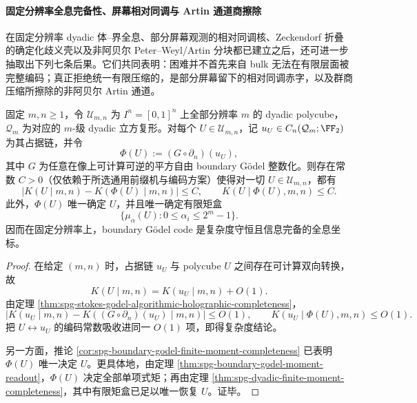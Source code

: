 \paragraph{固定分辨率全息完备性、屏幕相对同调与 Artin 通道商擦除}
在固定分辨率 dyadic 体--界全息、部分屏幕观测的相对同调核、Zeckendorf 折叠的确定化歧义壳以及非阿贝尔 Peter--Weyl/Artin 分块都已建立之后，还可进一步抽取出下列七条后果。它们共同表明：困难并不首先来自 bulk 无法在有限层面被完整编码；真正拒绝统一有限压缩的，是部分屏幕留下的相对同调赤字，以及群商压缩所擦除的非阿贝尔 Artin 通道。

\begin{theorem}\label{thm:xi-time-part9x-fixed-resolution-stokes-godel-strong-completeness}
固定 \(m,n\ge 1\)，令 \(\mathcal U_{m,n}\) 为 \(I^n=[0,1]^n\) 上全部分辨率 \(m\) 的 dyadic polycube，\(\mathcal Q_m\) 为对应的 \(m\)-级 dyadic 立方复形。对每个 \(U\in\mathcal U_{m,n}\)，记 \(u_U\in C_n(\mathcal Q_m;\FF_2)\) 为其占据链，并令
\[
\Phi(U):=(G\circ\partial_n)(u_U),
\]
其中 \(G\) 为任意在像上可计算可逆的平方自由 boundary Gödel 整数化。则存在常数 \(C>0\)（仅依赖于所选通用前缀机与编码方案）使得对一切 \(U\in\mathcal U_{m,n}\)，都有
\[
\bigl|K(U\mid m,n)-K(\Phi(U)\mid m,n)\bigr|\le C,
\qquad
K(U\mid \Phi(U),m,n)\le C.
\]
此外，\(\Phi(U)\) 唯一确定 \(U\)，并且唯一确定有限矩盒
\[
\{\mu_\alpha(U):0\le \alpha_i\le 2^m-1\}.
\]
因而在固定分辨率上，boundary Gödel code 是复杂度守恒且信息完备的全息坐标。
\end{theorem}
\begin{proof}
在给定 \((m,n)\) 时，占据链 \(u_U\) 与 polycube \(U\) 之间存在可计算双向转换，故
\[
K(U\mid m,n)=K(u_U\mid m,n)+O(1).
\]
由定理 \ref{thm:spg-stokes-godel-algorithmic-holographic-completeness}，
\[
\bigl|K(u_U\mid m,n)-K((G\circ\partial_n)(u_U)\mid m,n)\bigr|\le O(1),
\qquad
K(u_U\mid \Phi(U),m,n)\le O(1).
\]
把 \(U\leftrightarrow u_U\) 的编码常数吸收进同一 \(O(1)\) 项，即得复杂度结论。

另一方面，推论 \ref{cor:spg-boundary-godel-finite-moment-completeness} 已表明 \(\Phi(U)\) 唯一决定 \(U\)。更具体地，由定理 \ref{thm:spg-boundary-godel-moment-readout}，\(\Phi(U)\) 决定全部单项式矩；再由定理 \ref{thm:spg-dyadic-finite-moment-completeness}，其中有限矩盒已足以唯一恢复 \(U\)。证毕。
\end{proof}

